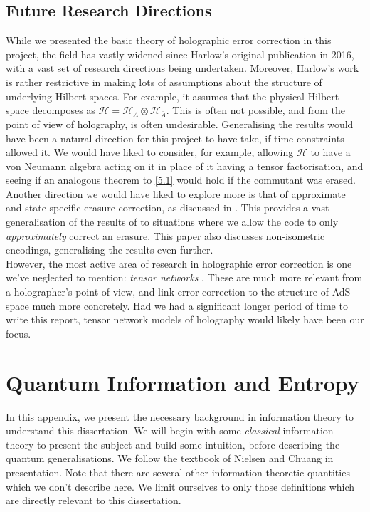 \documentclass[12pt,a4paper]{report}
\numberwithin{equation}{section}
\newcommand{\ol}[1]{\overline{#1}}
\theoremstyle{definition}
\theoremstyle{theorem}
\theoremstyle{theorem}
\theoremstyle{example}
\theoremstyle{definition}
\begin{document}
\section{Future Research Directions}
While we presented the basic theory of holographic error correction in this project, the field has vastly widened since Harlow's original publication in 2016, with a vast set of research directions being undertaken. Moreover, Harlow's work is rather restrictive in making lots of assumptions about the structure of underlying Hilbert spaces. For example, it assumes that the physical Hilbert space decomposes as $\mathcal{H}=\mathcal{H}_{A}\otimes\mathcal{H}_{\ol{A}}$. This is often not possible, and from the point of view of holography, is often undesirable. Generalising the results would have been a natural direction for this project to have take, if time constraints allowed it. We would have liked to consider, for example, allowing $\mathcal{H}$ to have a von Neumann algebra acting on it in place of it having a tensor factorisation, and seeing if an analogous theorem to \ref{5.1} would hold if the commutant was erased.\\
Another direction we would have liked to explore more is that of approximate and state-specific erasure correction, as discussed in \cite{QMS}. This provides a vast generalisation of the results of \cite{Harlow} to situations where we allow the code to only \textit{approximately} correct an erasure. This paper also discusses non-isometric encodings, generalising the results even further.\\
However, the most active area of research in holographic error correction is one we've neglected to mention: \textit{tensor networks} \cite{Jahn_2021}. These are much more relevant from a holographer's point of view, and link error correction to the structure of AdS space much more concretely. Had we had a significant longer period of time to write this report, tensor network models of holography would likely have been our focus.

\appendix

\chapter{Quantum Information and Entropy}
In this appendix, we present the necessary background in information theory to understand this dissertation. We will begin with some \textit{classical} information theory to present the subject and build some intuition, before describing the quantum generalisations. We follow the textbook of Nielsen and Chuang\cite{NielsenChuang} in presentation. Note that there are several other information-theoretic quantities which we don't describe here. We limit ourselves to only those definitions which are directly relevant to this dissertation.
\end{document}
